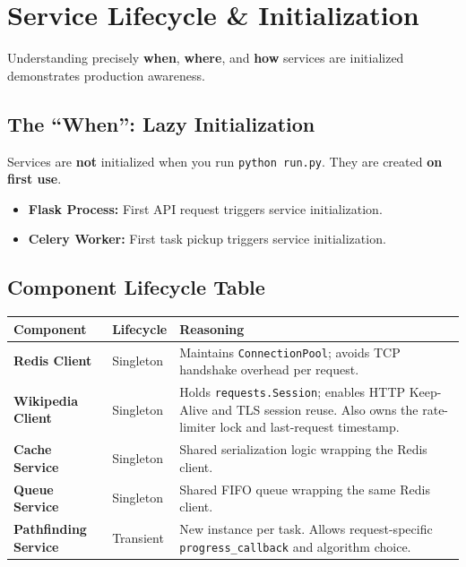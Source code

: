 \documentclass[11pt,a4paper]{article}
\begin{document}
\section{Service Lifecycle \& Initialization}

Understanding precisely \textbf{when}, \textbf{where}, and \textbf{how} services are initialized demonstrates production awareness.

\subsection{The ``When'': Lazy Initialization}

Services are \textbf{not} initialized when you run \texttt{python run.py}. They are created \textbf{on first use}.

\begin{itemize}[leftmargin=*]
    \item \textbf{Flask Process:} First API request triggers service initialization.
    \item \textbf{Celery Worker:} First task pickup triggers service initialization.
\end{itemize}

\subsection{Component Lifecycle Table}

\begin{tabularx}{\textwidth}{@{}>{\bfseries}l l X@{}}
\toprule
Component & Lifecycle & Reasoning \\
\midrule
Redis Client & Singleton & Maintains \texttt{ConnectionPool}; avoids TCP handshake overhead per request. \\
\addlinespace[0.3em]
Wikipedia Client & Singleton & Holds \texttt{requests.Session}; enables HTTP Keep-Alive and TLS session reuse. Also owns the rate-limiter lock and last-request timestamp. \\
\addlinespace[0.3em]
Cache Service & Singleton & Shared serialization logic wrapping the Redis client. \\
\addlinespace[0.3em]
Queue Service & Singleton & Shared FIFO queue wrapping the same Redis client. \\
\addlinespace[0.3em]
Pathfinding Service & Transient & New instance per task. Allows request-specific \texttt{progress\_callback} and algorithm choice. \\
\bottomrule
\end{tabularx}
\end{document}
